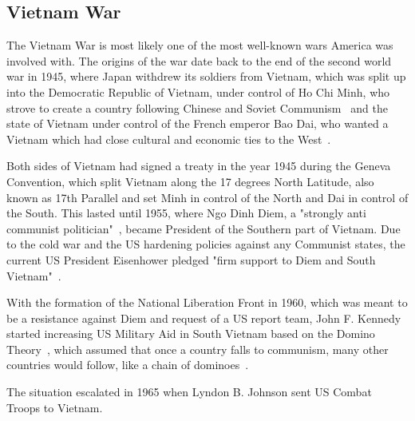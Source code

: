 \subsection{Vietnam War}
The Vietnam War is most likely one of the most well-known wars America was involved with.
The origins of the war date back to the end of the second world war in 1945, where Japan withdrew its soldiers from Vietnam, which was split up into the Democratic Republic of Vietnam, under control of Ho Chi Minh, who strove to create a country following Chinese and Soviet Communism~\autocite{vietnam-war-history} and the state of Vietnam under control of the French emperor Bao Dai, who wanted a Vietnam which had close cultural and economic ties to the West~\autocite{vietnam-war-history}.

Both sides of Vietnam had signed a treaty in the year 1945 during the Geneva Convention, which split Vietnam along the 17 degrees North Latitude, also known as 17th Parallel and set Minh in control of the North and Dai in control of the South. This lasted until 1955, where Ngo Dinh Diem, a "strongly anti communist politician"~\autocite{vietnam-war-history}, became President of the Southern part of Vietnam. Due to the cold war and the US hardening policies against any Communist states, the current US President Eisenhower pledged "firm support to Diem and South Vietnam"~\autocite{vietnam-war-history}.

With the formation of the National Liberation Front in 1960, which was meant to be a resistance against Diem and request of a US report team, John F. Kennedy started increasing US Military Aid in South Vietnam based on the Domino Theory~\autocite{vietnam-war-history}, which assumed that once a country falls to communism, many other countries would follow, like a chain of dominoes~\autocite{cold-war-domino-theory}.

The situation escalated in 1965 when Lyndon B. Johnson sent US Combat Troops to Vietnam.